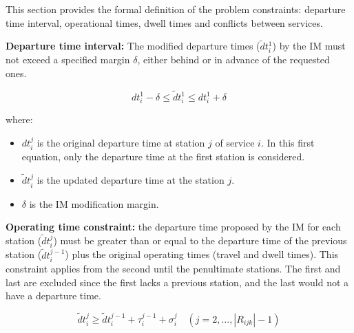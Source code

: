\documentclass[Afour,sagev,times]{sagej}
\begin{document}
This section provides the formal definition of the problem constraints: departure time interval, operational times, dwell times and conflicts between services.

\textbf{Departure time interval:} The modified departure times ($  \tilde dt_{i}^{1} $) by the \gls{IM} must not exceed a specified margin $\delta$, either behind or in advance of the requested ones.


\begin{equation}
    dt_{i}^{1} - \delta \leq \tilde dt_{i}^{1} \leq dt_{i}^{1} + \delta
\end{equation}

where:
\begin{itemize}
  \item $dt_{i}^{j}$ is the original departure time at station $j$ of service $i$. In this first equation, only the departure time at the first station is considered.
  \item $\tilde dt_{i}^{j}$ is the updated departure time at the station $ j $.
  \item $\delta$ is the \gls{IM} modification margin.
\end{itemize}

\textbf{Operating time constraint:} the departure time proposed by the \gls{IM} for each station ($ \tilde dt_{i}^{j} $) must be greater than or equal to the departure time of the previous station ($ \tilde dt_{i}^{j-1} $) plus the original operating times (travel and dwell times). This constraint applies from the second until the penultimate stations. The first and last are excluded since the first lacks a previous station, and the last would not a have a departure time.


\begin{equation}
\tilde dt_{i}^{j} \geq \tilde dt_{i}^{j-1} + \tau_{i}^{j-1} + \sigma_{i}^{j}
\quad
(j=2,\dots, |R_{ijk}| - 1)
\end{equation}
\end{document}
